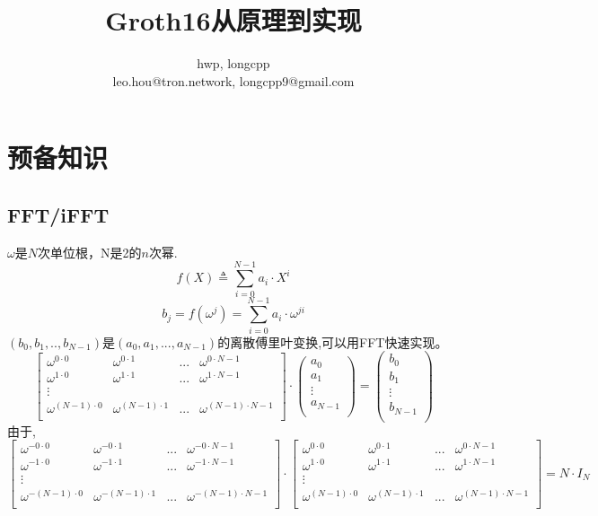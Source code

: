\documentclass{article}
\begin{document}
\title{Groth16从原理到实现}
\author{hwp, longcpp\\ \small{leo.hou@tron.network, longcpp9@gmail.com}}

\maketitle
\section{预备知识}
\subsection{FFT/iFFT}
$\omega$是$N$次单位根，N是2的$n$次幂.
$$ f(X) \triangleq \sum_{i=0}^{N-1}{a_i\cdot X^i} $$
$$ b_j = f(\omega^j)=\sum_{i=0}^{N-1}{a_i\cdot \omega^{ji}}$$
$(b_0,b_1,..,b_{N-1})$是$(a_0,a_1,...,a_{N-1})$的离散傅里叶变换,可以用FFT快速实现。\\
$$
\begin{bmatrix}
\omega^{0\cdot0} & \omega^{0\cdot1} & ... & \omega^{0\cdot{N-1}}\\
\omega^{1\cdot0} & \omega^{1\cdot1} & ... & \omega^{1\cdot{N-1}}\\
\vdots & \\
\omega^{(N-1)\cdot0} & \omega^{(N-1)\cdot1} & ... & \omega^{(N-1)\cdot{N-1}}\\
\end{bmatrix}
\cdot 
\begin{pmatrix} a_0 \\ a_1 \\ \vdots \\a_{N-1}\\ \end{pmatrix} = 
\begin{pmatrix} b_0 \\ b_1 \\ \vdots \\b_{N-1}\\ \end{pmatrix}
$$
由于,
$$
\begin{bmatrix}
\omega^{-0\cdot0} & \omega^{-0\cdot1} & ... & \omega^{-0\cdot{N-1}}\\
\omega^{-1\cdot0} & \omega^{-1\cdot1} & ... & \omega^{-1\cdot{N-1}}\\
\vdots & \\
\omega^{-(N-1)\cdot0} & \omega^{-(N-1)\cdot1} & ... & \omega^{-(N-1)\cdot{N-1}}\\
\end{bmatrix}
\cdot
\begin{bmatrix}
\omega^{0\cdot0} & \omega^{0\cdot1} & ... & \omega^{0\cdot{N-1}}\\
\omega^{1\cdot0} & \omega^{1\cdot1} & ... & \omega^{1\cdot{N-1}}\\
\vdots & \\
\omega^{(N-1)\cdot0} & \omega^{(N-1)\cdot1} & ... & \omega^{(N-1)\cdot{N-1}}\\
\end{bmatrix}
=N\cdot I_{N}
$$
\end{document}
